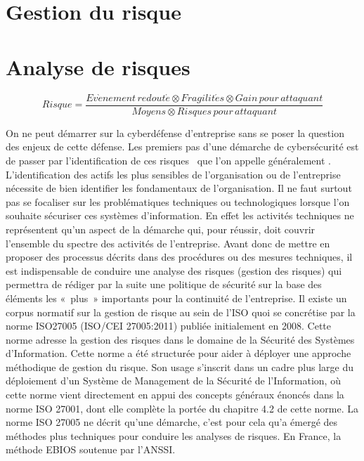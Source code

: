 
\section{Gestion du risque}


\utodo

\section{Analyse de risques}

\begin{nota}
\begin{equation}
Risque = \frac{Ev\grave{e}nement\,redout\acute{e}\otimes Fragilit\acute{e}s\otimes Gain\,pour\,attaquant}{Moyens\otimes Risques\,pour\,attaquant}
\end{equation}
\end{nota}


On ne peut démarrer sur la cyberdéfense d’entreprise sans se poser la question des enjeux de cette défense. Les premiers pas d’une démarche de cybersécurité est de passer  par l’identification de ces risques  que l’on appelle généralement .
L’identification des actifs les plus sensibles de l’organisation ou de l’entreprise nécessite de bien identifier les fondamentaux de l’organisation.
Il ne faut surtout pas se focaliser sur les problématiques techniques ou technologiques lorsque l’on souhaite sécuriser ces systèmes d’information. En effet les activités techniques   ne représentent qu’un aspect de la  démarche qui, pour réussir, doit couvrir l’ensemble du spectre des  activités de l'entreprise.
Avant donc de mettre en proposer des processus décrits dans des procédures ou des mesures techniques, il est indispensable de conduire une analyse des risques (gestion des risques) qui permettra de rédiger par la suite une politique de sécurité sur la base des éléments les « plus » importants pour la continuité de l’entreprise.
Il existe un corpus normatif sur la gestion de risque au sein de l’ISO quoi se concrétise par la norme ISO27005 (ISO/CEI 27005:2011) publiée initialement en 2008. Cette norme adresse la gestion des risques dans le domaine de la Sécurité des Systèmes d'Information.
Cette norme a été structurée pour aider à déployer une approche méthodique de gestion du risque. Son usage s’inscrit dans un cadre plus large du déploiement d’un Système de Management de la Sécurité de l'Information,  où cette norme vient directement en appui des concepts généraux énoncés dans la norme ISO 27001, dont elle complète la portée du chapitre 4.2 de cette norme.
La norme ISO 27005 ne décrit qu'une démarche, c’est pour cela qu’a émergé des méthodes plus techniques pour conduire les analyses de risques. En France, la méthode EBIOS soutenue par l’ANSSI. 

